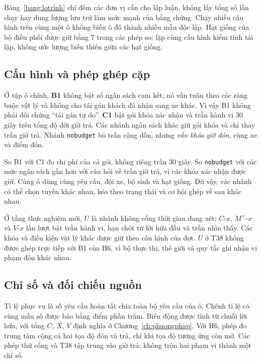 Bảng~\ref{bang:lotrinh} chỉ đếm các đơn vị cần cho lập luận, không lấy tổng số lần chạy hay
dung lượng lưu trữ làm mức mạnh của bằng chứng. Chạy nhiều cấu hình trên cùng một ô không
biến ô đó thành nhiều mẫu độc lập. Hạt giống của bộ điều phối được giữ bằng 7 trong các
phép so; lặp cùng cấu hình kiểm tính tái lập, không ước lượng biến thiên giữa các hạt giống.



\subsection{Cấu hình và phép ghép cặp}

Ở tập ô chính, \textbf{B1} không bật sổ ngân sách cam kết; nó vẫn tuân theo các ràng buộc
vật lý và không cho tái gán khách đã nhận sang xe khác. Vì vậy B1 không phải đối chứng
``tái gán tự do''. \textbf{C1} bật gói khóa xác nhận và trần hành vi 30 giây trên tổng độ
dời giờ trả. Các nhánh ngân sách khác giữ gói khóa và chỉ thay trần giờ trả. Nhánh
\texttt{nobudget} bỏ trần cộng dồn, nhưng \emph{vẫn khóa giờ đón}, cùng xe và điểm đón.

So B1 với C1 đo chi phí của cả gói, không riêng trần 30 giây. So \texttt{nobudget} với các
mức ngân sách gần hơn với câu hỏi về trần giờ trả, vì các khóa xác nhận được giữ. Cùng ô
dùng cùng yêu cầu, đội xe, bộ sinh và hạt giống. Dù vậy, các nhánh có thể chọn tuyến khác
nhau, kéo theo trạng thái và cơ hội ghép về sau khác nhau.

Ở tầng thực nghiệm mới, $U$ là nhánh không cổng thời gian đang xét; $C$-$x$, $M^{+}$-$x$
và $V$-$x$ lần lượt bật trần hành vi, hạn chót từ lời hứa đầu và trần nhìn thấy. Các khóa
và điều kiện vật lý khác được giữ theo cấu hình của đợt. $U$ ở T38 không được ghép trực
tiếp với B1 của H6, vì bộ thực thi, thế giới và quy tắc ghi nhận vi phạm đón khác nhau.

\subsection{Chỉ số và đối chiếu nguồn}

Tỉ lệ phục vụ là số yêu cầu hoàn tất chia toàn bộ yêu cầu của ô. Chênh tỉ lệ có cùng mẫu số
được báo bằng điểm phần trăm. Biến động được tính từ chuỗi lời hứa, với tổng $C$, $X$, $V$
định nghĩa ở Chương~\ref{ch:phuongphap}. Với H6, phép đo trung tâm cộng cả hai tọa độ đón
và trả, chỉ khi tọa độ tương ứng còn mở. Các phép thử cổng và T38 tập trung vào giờ trả;
không trộn hai phạm vi thành một chỉ số.

